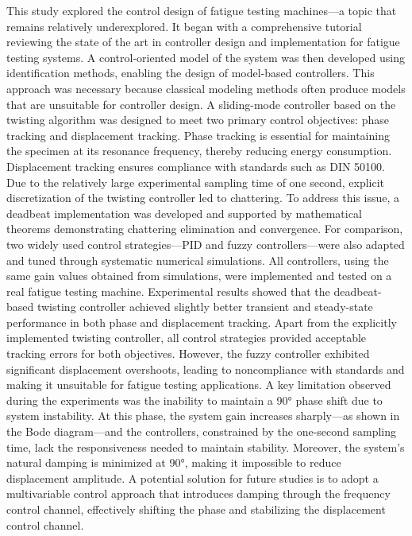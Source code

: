 \documentclass[lettersize,journal]{IEEEtran}
\begin{document}
This study explored the control design of fatigue testing machines—a topic that remains relatively underexplored. It began with a comprehensive tutorial reviewing the state of the art in controller design and implementation for fatigue testing systems. A control-oriented model of the system was then developed using identification methods, enabling the design of model-based controllers. This approach was necessary because classical modeling methods often produce models that are unsuitable for controller design.
A sliding-mode controller based on the twisting algorithm was designed to meet two primary control objectives: phase tracking and displacement tracking. Phase tracking is essential for maintaining the specimen at its resonance frequency, thereby reducing energy consumption. Displacement tracking ensures compliance with standards such as DIN 50100. Due to the relatively large experimental sampling time of one second, explicit discretization of the twisting controller led to chattering. To address this issue, a deadbeat implementation was developed and supported by mathematical theorems demonstrating chattering elimination and convergence. For comparison, two widely used control strategies—PID and fuzzy controllers—were also adapted and tuned through systematic numerical simulations.
All controllers, using the same gain values obtained from simulations, were implemented and tested on a real fatigue testing machine. Experimental results showed that the deadbeat-based twisting controller achieved slightly better transient and steady-state performance in both phase and displacement tracking. Apart from the explicitly implemented twisting controller, all control strategies provided acceptable tracking errors for both objectives. However, the fuzzy controller exhibited significant displacement overshoots, leading to noncompliance with standards and making it unsuitable for fatigue testing applications.
A key limitation observed during the experiments was the inability to maintain a 90° phase shift due to system instability. At this phase, the system gain increases sharply—as shown in the Bode diagram—and the controllers, constrained by the one-second sampling time, lack the responsiveness needed to maintain stability. Moreover, the system’s natural damping is minimized at 90°, making it impossible to reduce displacement amplitude. A potential solution for future studies is to adopt a multivariable control approach that introduces damping through the frequency control channel, effectively shifting the phase and stabilizing the displacement control channel.
\end{document}
